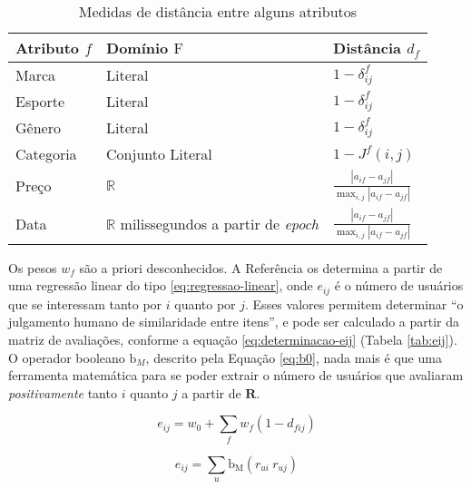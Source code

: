 \begin{table}[hp]
\begin{center}
    \caption{Medidas de distância entre alguns atributos}
    \label{tab:medidas-distancia}
    \begin{tabular}{  | >{\arraybackslash} m{3cm} | >{\arraybackslash} m{3cm} | >{\centering\arraybackslash} m{3cm} | } 
    \hline
    \textbf{Atributo} $f$ & \textbf{Domínio} $\mathrm{F}$ & \textbf{Distância} $d_f$ \\ \hline
    Marca & Literal & $1-\delta^f_{ij}$ \\ \hline    
    Esporte & Literal & $1-\delta^f_{ij}$ \\ \hline
    Gênero & Literal & $1-\delta^f_{ij}$ \\ \hline            
    Categoria & Conjunto Literal & $1-J^f(i,j)$ \\ \hline            
    Preço & $\mathbb{R}$ & $ \frac{\left| a_{if}-a_{jf} \right|}{\max_{i,j}{\left| a_{if}-a_{jf} \right|}} $ \\ \hline
    Data & $\mathbb{R}$ milissegundos a partir de \textit{epoch} \cite{epoch} & $ \frac{\left| a_{if}-a_{jf} \right|}{\max_{i,j}{\left| a_{if}-a_{jf} \right|}} $ \\ \hline
    \end{tabular}
\end{center}
\end{table}
 
Os pesos $w_f$ são a priori desconhecidos. A Referência  os determina a partir de uma regressão linear do tipo \ref{eq:regressao-linear}, onde $e_{ij}$ é o número de usuários que se interessam tanto por $i$ quanto por $j$. Esses valores permitem determinar ``o julgamento humano de similaridade entre itens'', e pode ser calculado a partir da matriz de avaliações, conforme a equação \ref{eq:determinacao-eij} (Tabela \ref{tab:eij}). O operador booleano $\mathrm{b}_M$, descrito pela Equação \ref{eq:b0}, nada mais é que uma ferramenta matemática para se poder extrair o número de usuários que avaliaram \textit{positivamente} tanto $i$ quanto $j$ a partir de $\mathbf{R}$. 


\begin{equation}
\label{eq:regressao-linear} 
    e_{ij} = w_0 + \sum_{f}{w_{f} \left(1-d_{fij}\right)}
\end{equation} 


\begin{equation}
\label{eq:determinacao-eij} 
    e_{ij} = \sum_{u}{\mathrm{b_M}\left(r_{ui} ~ r_{uj}\right)}
\end{equation} 

